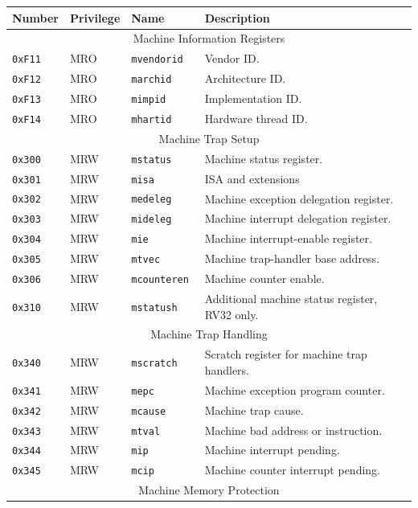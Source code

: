 \begin{table}[htb!]
\begin{center}
\begin{tabular}{|l|l|l|l|}
\hline
Number    & Privilege & Name & Description \\
\hline
\multicolumn{4}{|c|}{Machine Information Registers} \\
\hline
\tt 0xF11 & MRO &\tt mvendorid   & Vendor ID. \\
\tt 0xF12 & MRO &\tt marchid     & Architecture ID. \\
\tt 0xF13 & MRO &\tt mimpid      & Implementation ID. \\
\tt 0xF14 & MRO &\tt mhartid     & Hardware thread ID. \\
\hline
\multicolumn{4}{|c|}{Machine Trap Setup} \\
\hline
\tt 0x300 & MRW  &\tt mstatus    & Machine status register. \\
\tt 0x301 & MRW  &\tt misa       & ISA and extensions \\
\tt 0x302 & MRW  &\tt medeleg    & Machine exception delegation register. \\
\tt 0x303 & MRW  &\tt mideleg    & Machine interrupt delegation register. \\
\tt 0x304 & MRW  &\tt mie        & Machine interrupt-enable register. \\
\tt 0x305 & MRW  &\tt mtvec      & Machine trap-handler base address. \\
\tt 0x306 & MRW  &\tt mcounteren & Machine counter enable. \\
\tt 0x310 & MRW  &\tt mstatush   & Additional machine status register, RV32 only. \\
\hline
\multicolumn{4}{|c|}{Machine Trap Handling} \\
\hline
\tt 0x340 & MRW  &\tt mscratch   & Scratch register for machine trap handlers. \\
\tt 0x341 & MRW  &\tt mepc       & Machine exception program counter. \\
\tt 0x342 & MRW  &\tt mcause     & Machine trap cause. \\
\tt 0x343 & MRW  &\tt mtval      & Machine bad address or instruction. \\
\tt 0x344 & MRW  &\tt mip        & Machine interrupt pending. \\
\tt 0x345 & MRW  &\tt mcip       & Machine counter interrupt pending. \\
\hline
\multicolumn{4}{|c|}{Machine Memory Protection} \\

\end{tabular}
\end{center}
\end{table}
